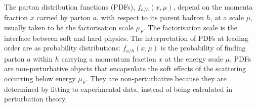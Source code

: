 \documentclass[main.tex]{subfiles}
\begin{document}
    The parton distribution functions (PDFs), $f_{a/h}(x, \mu)$,
    depend on the momenta fraction $x$ carried by parton $a$,
    with respect to its parent hadron $h$, at a scale $\mu$,
    usually taken to be the factorisation scale $\mu_{F}$.
    The factorisation scale is the interface between soft and hard physics.
    The interpretation of PDFs at leading order are
    as probability distributions: $f_{a/h}(x, \mu)$ is
    the probability of finding parton $a$ within $h$
    carrying a momentum fraction $x$ at the energy scale $\mu$.
    PDFs are non-perturbative objects that encapsulate
    the soft effects of the scattering occurring below energy
    $\mu_{F}$. They are non-perturbative because
    they are determined by fitting to experimental data,
    instead of being calculated in perturbation theory.
    
\end{document}

